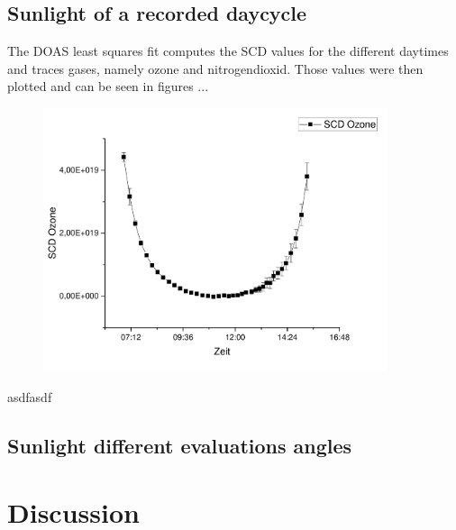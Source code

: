 \documentclass[12pt, english]{scrartcl} %
\begin{document}
\begin{multicols}{2}
\subsection{Sunlight of a recorded daycycle}
The DOAS least squares fit computes the SCD values for the different daytimes and traces gases, namely ozone and nitrogendioxid. Those values were then plotted and can be seen in figures ...
\begin{figure}
\includegraphics[width= 0.9\textwidth]{graphics/o3scd.pdf}
\end{figure}
asdfasdf

\subsection{Sunlight different evaluations angles}


\section{Discussion}
\end{multicols}
\end{document}
